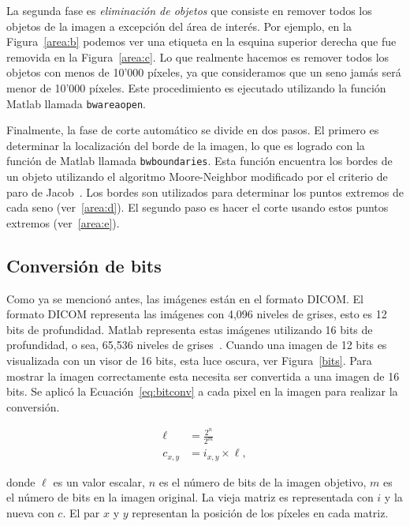 La segunda fase es \textit{eliminación de objetos} que consiste en remover
todos los objetos de la imagen a excepción del área de interés. Por ejemplo, en
la Figura~\ref{area:b} podemos ver una etiqueta en la esquina superior derecha
que fue removida en la Figura~\ref{area:c}. Lo que realmente hacemos es remover
todos los objetos con menos de 10'000 píxeles, ya que consideramos que un seno
jamás será menor de 10'000 píxeles. Este procedimiento es ejecutado utilizando
la función Matlab llamada \texttt{bwareaopen}.

Finalmente, la fase de corte automático se divide en dos pasos. El primero es
determinar la localización del borde de la imagen, lo que es logrado con la
función de Matlab llamada \texttt{bwboundaries}. Esta función encuentra los
bordes de un objeto utilizando el algoritmo Moore-Neighbor modificado por el
criterio de paro de Jacob~\cite{gonzalez2009digital}. Los bordes son utilizados
para determinar los puntos extremos de cada seno (ver~\ref{area:d}). El segundo
paso es hacer el corte usando estos puntos extremos (ver~\ref{area:e}).

\subsection{Conversión de bits}

Como ya se mencionó antes, las imágenes están en el formato DICOM. El formato
DICOM representa las imágenes con 4,096 niveles de grises, esto es 12 bits de
profundidad. Matlab representa estas imágenes utilizando 16 bits de
profundidad, o sea, 65,536 niveles de grises~\cite{mustra2008efficient}. Cuando
una imagen de 12 bits es visualizada con un visor de 16 bits, esta luce oscura,
ver Figura~\ref{bits}. Para mostrar la imagen correctamente esta necesita ser
convertida a una imagen de 16 bits. Se aplicó la Ecuación~\ref{eq:bitconv} a
cada pixel en la imagen para realizar la conversión.

\begin{equation}
\label{eq:bitconv}
    \begin{split}
            \ell &= \frac{2^{n}}{2^{m}} \\
            c_{x,y} &= i_{x, y} \times \ell,
    \end{split}
\end{equation}

\noindent donde $\ell$ es un valor escalar, $n$ es el número de bits de la imagen
objetivo, $m$ es el número de bits en la imagen original. La vieja matriz es
representada con $i$ y la nueva con $c$. El par $x$ y $y$ representan la
posición de los píxeles en cada matriz.


